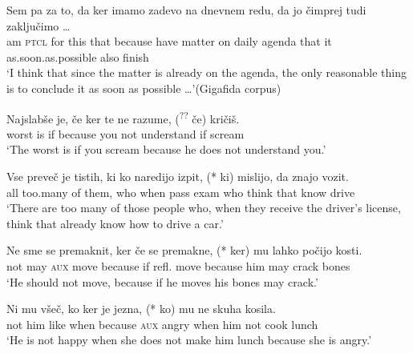 \documentclass[output=paper,colorlinks,citecolor=brown]{langsci/langscibook}
\begin{document}
\begin{exe}
\ex \label{ex:plesnicar:nine}
\gll  Sem	pa	za	to,	da	ker		imamo	zadevo	na dnevnem	redu,	da	jo	čimprej	tudi	zaključimo {\ldots}\\
 am	\textsc{ptcl}	for	this	that	because	have	matter	on daily		agenda	that	it	as.soon.as.possible		also	finish	\\
\trans `I think that since the matter is already on the agenda, the only reasonable thing is to conclude it as soon as possible {\ldots}'\hfill (Gigafida corpus)
\end{exe}

\begin{exe}
\ex \label{ex:plesnicar:ten}
\gll Najslabše 	je,	če	ker		te	ne	razume,	(\textsuperscript{??}\hspace{-2pt} če) kričiš. \\
	worst		is	if	because	you	not	understand	{} if scream\\
\trans `The worst is if you scream because he does not understand you.'
\end{exe}

\begin{exe}
\ex \label{ex:plesnicar:eleven}
\gll  Vse	preveč	je	tistih,	ki 	ko	naredijo	izpit,	(*\hspace{-2pt} ki) mislijo,	da	znajo	vozit.\\
	all	too.many of them,	who	when	pass		exam	{} who think		that	know	drive\\
\trans `There are too many of those people who, when they receive the driver's license, think that already know how to drive a car.' %
\end{exe}
\begin{exe}

\ex \label{ex:plesnicar:twelve}
\gll Ne	sme	se	premaknit,	ker		če	se	premakne, (*\hspace{-2pt} ker)		mu	lahko	počijo	kosti.\\
	not	may	\textsc{aux}	move	because	if	refl.	move {} because	him	may	crack	bones\\
\trans `He should not move, because if he moves his bones may crack.'
\end{exe}


\begin{exe}
\ex \label{ex:plesnicar:thirteen}
\gll Ni	mu	všeč,	ko	ker		je	jezna,	(*\hspace{-2pt} ko)	mu	ne	skuha kosila. \\
	not	him	like	when	because	\textsc{aux}	angry	{} when	him	not	cook lunch \\
\trans `He is not happy when she does not make him lunch because she is angry.'
\end{exe}
\end{document}

